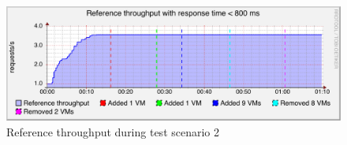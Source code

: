 \documentclass[english]{tktltiki2}
\theoremstyle{definition}
\theoremstyle{remark}
\begin{document}
\begin{figure}[htbp]
	\includegraphics[width=\textwidth]{images/referencethroughputgraph-test23}
	\caption{Reference throughput during test scenario 2}
	\label{fig:referenceThroughputScenario2}
\end{figure}

\clearpage

%
%
% 
%




\end{document}
